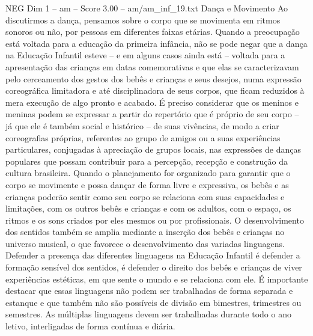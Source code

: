 \begin{textsample}{NEG Dim 1 – am – Score 3.00 – am/am\_inf\_19.txt}  \label{ex:f1_neg_065}
Dança e Movimento Ao discutirmos a dança, pensamos sobre o corpo que se movimenta em ritmos sonoros ou não, por pessoas em diferentes faixas etárias.
Quando a preocupação está voltada para a educação da primeira infância, não se pode negar que a dança na Educação Infantil esteve – e em alguns casos ainda está – voltada para a apresentação das crianças em datas comemorativas e que elas se caracterizavam pelo cerceamento dos gestos dos bebês e crianças e seus desejos, numa expressão coreográfica limitadora e até disciplinadora de seus corpos, que ficam reduzidos à mera execução de algo pronto e acabado.
É preciso considerar que os meninos e meninas podem se expressar a partir do repertório que é próprio de seu corpo – já que ele é também social e histórico – de suas vivências, de modo a criar coreografias próprias, referentes ao grupo de amigos ou a suas experiências particulares, conjugadas à apreciação de grupos locais, nas expressões de danças populares que possam contribuir para a percepção, recepção e construção da cultura brasileira.
Quando o planejamento for organizado para garantir que o corpo se movimente e possa dançar de forma livre e expressiva, os bebês e as crianças poderão sentir como seu corpo se relaciona com suas capacidades e limitações, com os outros bebês e crianças e com os adultos, com o espaço, os ritmos e os sons criados por eles mesmos ou por profissionais.
O desenvolvimento dos sentidos também se amplia mediante a inserção dos bebês e crianças no universo musical, o que favorece o desenvolvimento das variadas linguagens.
Defender a presença das diferentes linguagens na Educação Infantil é defender a formação sensível dos sentidos, é defender o direito dos bebês e crianças de viver experiências estéticas, em que sente o mundo e se relaciona com ele.
É importante destacar que essas linguagens não podem ser trabalhadas de forma separada e estanque e que também não são possíveis de divisão em bimestres, trimestres ou semestres.
As múltiplas linguagens devem ser trabalhadas durante todo o ano letivo, interligadas de forma contínua e diária.

\end{textsample}
